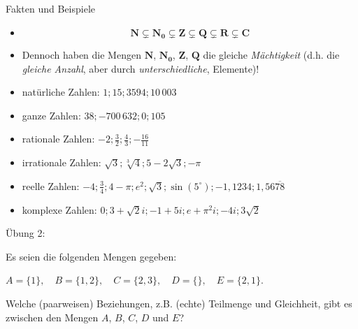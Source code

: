 \documentclass[12pt,ngerman,a4paper,ignorenonframetext,]{beamer}
\providecommand{\tightlist}{%
  \setlength{\itemsep}{0pt}\setlength{\parskip}{0pt}}
\begin{document}
\begin{frame}{Fakten und Beispiele}
\protect\hypertarget{fakten-und-beispiele}{}


\begin{Fakten}[]

\begin{itemize}
\item
  \[\mathbf{N} \subsetneq \mathbf{N_0} \subsetneq \mathbf{Z} \subsetneq \mathbf{Q} \subsetneq \mathbf{R} \subsetneq \mathbf{C}\]
\item
  Dennoch haben die Mengen \(\mathbf{N}\), \(\mathbf{N_0}\),
  \(\mathbf{Z}\), \(\mathbf{Q}\) die gleiche \emph{Mächtigkeit}
  \mbox{(d.\thinspace{}h.}\xspace{} die \emph{gleiche Anzahl}, aber
  durch \emph{unterschiedliche}, Elemente)!
\end{itemize}

\end{Fakten}


\begin{Beispiele}[]

\begin{itemize}
\tightlist
\item
  natürliche Zahlen: \(1; 15; 3594; 10\,003\)
\item
  ganze Zahlen: \(38; -700\,632; 0; 105\)
\item
  rationale Zahlen: \(-2; \frac{3}{2}; \frac43; -\frac{16}{11}\)
\item
  irrationale Zahlen: \(\sqrt{3}; \sqrt[3]{4}; 5-2\sqrt{3}; -\pi\)
\item
  reelle Zahlen:
  \(-4; \frac34; 4-\pi; e^2; \sqrt{3}; \sin(5^\circ); -1{,}1234; 1{,}56\overline{78}\)
\item
  komplexe Zahlen: \(0; 3+\sqrt{2}i; -1+5i; e+\pi^2i; -4i; 3\sqrt{2}\)
\end{itemize}

\end{Beispiele}

\end{frame}

\begin{frame}{Übung 2:}
\protect\hypertarget{ubung-2}{}

Es seien die folgenden Mengen gegeben:

\(A = \{1\}, \quad B=\{1,2\}, \quad C=\{2,3\}, \quad D=\{\}, \quad E = \{2, 1\}\).

Welche (paarweisen) Beziehungen, \mbox{z.\thinspace{}B.}\xspace{}
(echte) Teilmenge und Gleichheit, gibt es zwischen den Mengen \(A\),
\(B\), \(C\), \(D\) und \(E\)?


\end{frame}
\end{document}
